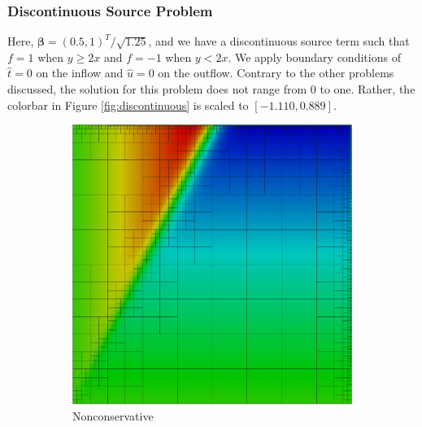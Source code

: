\documentclass[letterpaper]{article}
\def\bbeta{\boldsymbol\beta}
\begin{document}
\subsubsection{Discontinuous Source Problem}
Here, $\bbeta=(0.5,1)^T/\sqrt{1.25}$, and we have a discontinuous source term
such that $f=1$ when $y\ge2x$ and $f=-1$ when $y<2x$. We apply boundary
conditions of $\hat t=0$ on the inflow and $\hat u=0$ on the outflow. Contrary
to the other problems discussed, the solution for this problem does not range
from 0 to one. Rather, the colorbar in Figure \ref{fig:discontinuous} is
scaled to  $[-1.110,0.889]$.

\begin{figure}[p]
\centering
\begin{subfigure}[t]{0.45\textwidth}
\centering
\includegraphics[width=\textwidth]{figs/Discontinuous/graph8nc.png}
\caption{Nonconservative}
\label{fig:discontinuousModified8nc}
\end{subfigure}
\begin{subfigure}[t]{0.45\textwidth}
\centering

\end{subfigure}
\end{figure}
\end{document}
